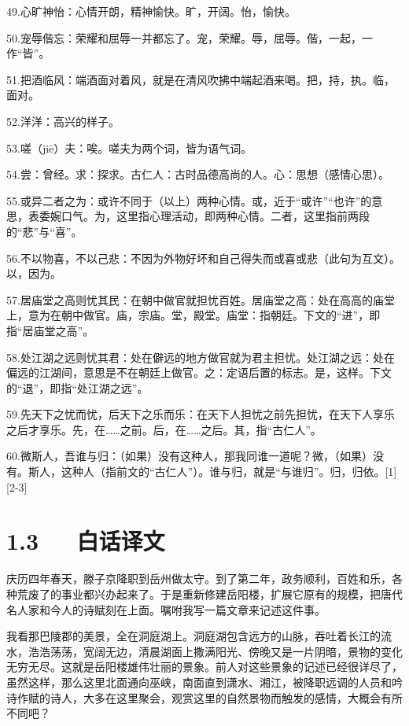 \documentclass[letterpaper,10pt,english]{sphinxmanual}
\begin{document}
49.心旷神怡：心情开朗，精神愉快。旷，开阔。怡，愉快。

50.宠辱偕忘：荣耀和屈辱一并都忘了。宠，荣耀。辱，屈辱。偕，一起，一作“皆”。

51.把酒临风：端酒面对着风，就是在清风吹拂中端起酒来喝。把，持，执。临，面对。

52.洋洋：高兴的样子。

53.嗟（jiē）夫：唉。嗟夫为两个词，皆为语气词。

54.尝：曾经。求：探求。古仁人：古时品德高尚的人。心：思想（感情心思）。

55.或异二者之为：或许不同于（以上）两种心情。或，近于“或许”“也许”的意思，表委婉口气。为，这里指心理活动，即两种心情。二者，这里指前两段的“悲”与“喜”。

56.不以物喜，不以己悲：不因为外物好坏和自己得失而或喜或悲（此句为互文）。以，因为。

57.居庙堂之高则忧其民：在朝中做官就担忧百姓。居庙堂之高：处在高高的庙堂上，意为在朝中做官。庙，宗庙。堂，殿堂。庙堂：指朝廷。下文的“进”，即指“居庙堂之高”。

58.处江湖之远则忧其君：处在僻远的地方做官就为君主担忧。处江湖之远：处在偏远的江湖间，意思是不在朝廷上做官。之：定语后置的标志。是，这样。下文的“退”，即指“处江湖之远”。

59.先天下之忧而忧，后天下之乐而乐：在天下人担忧之前先担忧，在天下人享乐之后才享乐。先，在……之前。后，在……之后。其，指“古仁人”。

60.微斯人，吾谁与归：（如果）没有这种人，那我同谁一道呢？微，（如果）没有。斯人，这种人（指前文的“古仁人”）。谁与归，就是“与谁归”。归，归依。{[}1{]}{[}2-3{]}


\section{1.3   白话译文}
\label{\detokenize{p01_u6563_u6587/_u8303_u4ef2_u6df9-_u5cb3_u9633_u697c_u8bb0:id5}}
庆历四年春天，滕子京降职到岳州做太守。到了第二年，政务顺利，百姓和乐，各种荒废了的事业都兴办起来了。于是重新修建岳阳楼，扩展它原有的规模，把唐代名人家和今人的诗赋刻在上面。嘱咐我写一篇文章来记述这件事。

我看那巴陵郡的美景，全在洞庭湖上。洞庭湖包含远方的山脉，吞吐着长江的流水，浩浩荡荡，宽阔无边，清晨湖面上撒满阳光、傍晚又是一片阴暗，景物的变化无穷无尽。这就是岳阳楼雄伟壮丽的景象。前人对这些景象的记述已经很详尽了，虽然这样，那么这里北面通向巫峡，南面直到潇水、湘江，被降职远调的人员和吟诗作赋的诗人，大多在这里聚会，观赏这里的自然景物而触发的感情，大概会有所不同吧？
\end{document}
